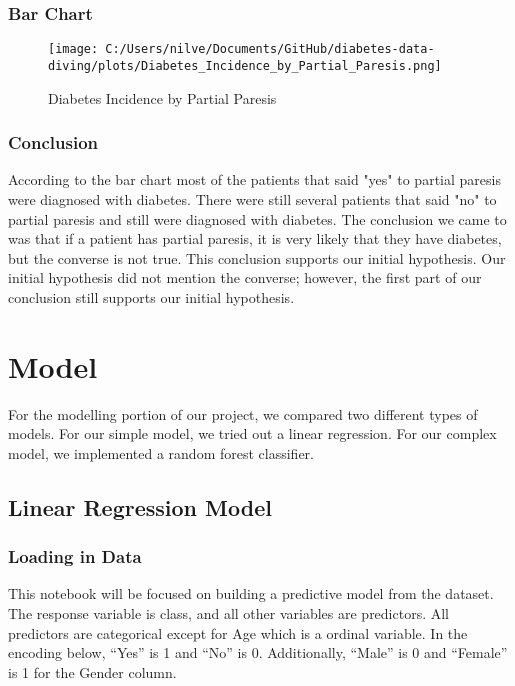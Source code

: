 \documentclass[
]{article}
\begin{document}
\hypertarget{header-n902}{%
\subsubsection{Bar Chart}\label{header-n902}}

\begin{figure}
\centering
\texttt{[image: C:/Users/nilve/Documents/GitHub/diabetes-data-diving/plots/Diabetes\_Incidence\_by\_Partial\_Paresis.png]}
\caption{Diabetes Incidence by Partial Paresis}
\end{figure}

\hypertarget{header-n904}{%
\subsubsection{Conclusion}\label{header-n904}}

According to the bar chart most of the patients that said "yes" to
partial paresis were diagnosed with diabetes. There were still several
patients that said "no" to partial paresis and still were diagnosed with
diabetes. The conclusion we came to was that if a patient has partial
paresis, it is very likely that they have diabetes, but the converse is
not true. This conclusion supports our initial hypothesis. Our initial
hypothesis did not mention the converse; however, the first part of our
conclusion still supports our initial hypothesis.

\hypertarget{header-n906}{%
\section{Model}\label{header-n906}}

For the modelling portion of our project, we compared two different
types of models. For our simple model, we tried out a linear regression.
For our complex model, we implemented a random forest classifier.

\hypertarget{header-n908}{%
\subsection{Linear Regression Model}\label{header-n908}}

\hypertarget{header-n909}{%
\subsubsection{Loading in Data}\label{header-n909}}

This notebook will be focused on building a predictive model from the
dataset. The response variable is class, and all other variables are
predictors. All predictors are categorical except for Age which is a
ordinal variable. In the encoding below, ``Yes'' is 1 and ``No'' is 0.
Additionally, ``Male'' is 0 and ``Female'' is 1 for the Gender column.
\end{document}

